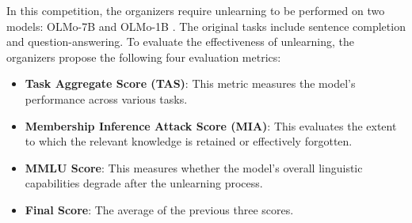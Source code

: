 \documentclass[11pt]{article}
\begin{document}








In this competition, the organizers require unlearning to be performed on two models: OLMo-7B and OLMo-1B \cite{groeneveld2024olmo}. The original tasks include sentence completion and question-answering. To evaluate the effectiveness of unlearning, the organizers propose the following four evaluation metrics:
\begin{itemize}
	\item \textbf{Task Aggregate Score (TAS)}: This metric measures the model's performance across various tasks.
	\item \textbf{Membership Inference Attack Score (MIA)}: This evaluates the extent to which the relevant knowledge is retained or effectively forgotten.
	\item \textbf{MMLU Score}: This measures whether the model's overall linguistic capabilities degrade after the unlearning process.
	\item \textbf{Final Score}: The average of the previous three scores.
\end{itemize}
\end{document}
